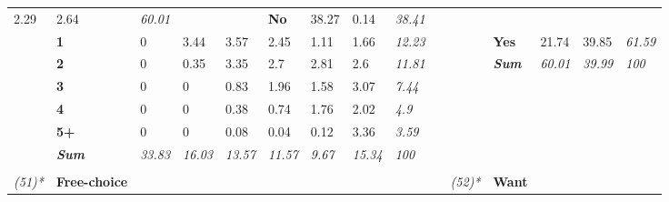 \begin{table}
{\begin{threeparttable}
\begin{tabular}{lllllllllllllll}
  \cellcolor[HTML]{F9F9F9}2.29 &
  \cellcolor[HTML]{F9F9F9}2.64 &
  \textit{60.01} &
   &
   &
  \textbf{No} &
  \cellcolor[HTML]{AAAAAA}38.27 &
  \cellcolor[HTML]{FFFFFF}0.14 &
  \textit{38.41} \\
 &
  \textbf{1} &
  \cellcolor[HTML]{FFFFFF}0 &
  \cellcolor[HTML]{F6F6F6}3.44 &
  \cellcolor[HTML]{F6F6F6}3.57 &
  \cellcolor[HTML]{F9F9F9}2.45 &
  \cellcolor[HTML]{FDFDFD}1.11 &
  \cellcolor[HTML]{FBFBFB}1.66 &
  \textit{12.23} &
   &
   &
  \textbf{Yes} &
  \cellcolor[HTML]{CFCFCF}21.74 &
  \cellcolor[HTML]{A6A6A6}39.85 &
  \textit{61.59} \\
 &
  \textbf{2} &
  \cellcolor[HTML]{FFFFFF}0 &
  \cellcolor[HTML]{FFFFFF}0.35 &
  \cellcolor[HTML]{F7F7F7}3.35 &
  \cellcolor[HTML]{F8F8F8}2.7 &
  \cellcolor[HTML]{F8F8F8}2.81 &
  \cellcolor[HTML]{F9F9F9}2.6 &
  \textit{11.81} &
   &
   &
  \textit{\textbf{Sum}} &
  \textit{60.01} &
  \textit{39.99} &
  \textit{100} \\
 &
  \textbf{3} &
  \cellcolor[HTML]{FFFFFF}0 &
  \cellcolor[HTML]{FFFFFF}0 &
  \cellcolor[HTML]{FDFDFD}0.83 &
  \cellcolor[HTML]{FAFAFA}1.96 &
  \cellcolor[HTML]{FBFBFB}1.58 &
  \cellcolor[HTML]{F7F7F7}3.07 &
  \textit{7.44} &
   &
   &
   &
   &
   &
  \textit{} \\
 &
  \textbf{4} &
  \cellcolor[HTML]{FFFFFF}0 &
  \cellcolor[HTML]{FFFFFF}0 &
  \cellcolor[HTML]{FFFFFF}0.38 &
  \cellcolor[HTML]{FEFEFE}0.74 &
  \cellcolor[HTML]{FBFBFB}1.76 &
  \cellcolor[HTML]{FAFAFA}2.02 &
  \textit{4.9} &
   &
   &
   &
   &
   &
  \textit{} \\
 &
  \textbf{5+} &
  \cellcolor[HTML]{FFFFFF}0 &
  \cellcolor[HTML]{FFFFFF}0 &
  \cellcolor[HTML]{FFFFFF}0.08 &
  \cellcolor[HTML]{FFFFFF}0.04 &
  \cellcolor[HTML]{FFFFFF}0.12 &
  \cellcolor[HTML]{F7F7F7}3.36 &
  \textit{3.59} &
   &
   &
   &
   &
   &
  \textit{} \\
\textit{} &
  \textit{\textbf{Sum}} &
  \textit{33.83} &
  \textit{16.03} &
  \textit{13.57} &
  \textit{11.57} &
  \textit{9.67} &
  \textit{15.34} &
  \textit{100} &
  \textit{} &
  \textit{} &
  \textit{} &
  \textit{} &
  \textit{} &
  \textit{} \\
\textit{} &
  \textit{\textbf{}} &
  \textit{} &
  \textit{} &
  \textit{} &
  \textit{} &
  \textit{} &
  \textit{} &
  \textit{} &
  \textit{} &
  \textit{} &
  \textit{} &
  \textit{} &
  \textit{} &
  \textit{} \\
\textit{(51)*} &
  \textbf{Free-choice} &
   &
   &
   &
   &
   &
   &
  \textit{} &
   &
  \textit{(52)*} &
  \textbf{Want} &
   &
   &

\end{tabular}
\end{threeparttable}}
\end{table}
